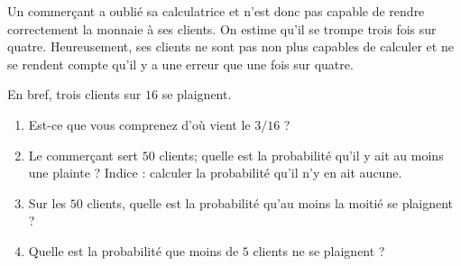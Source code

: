 
\begin{exercice}\label{exoPremiere-0088}

Un commerçant a oublié sa calculatrice et n'est donc pas capable de rendre correctement la monnaie à ses clients. On estime qu'il se trompe trois fois sur quatre. Heureusement, ses clients ne sont pas non plus capables de calculer et ne se rendent compte qu'il y a une erreur que une fois sur quatre.

En bref, trois clients sur \( 16\) se plaignent.
\begin{enumerate}
    \item
        Est-ce que vous comprenez d'où vient le \( 3/16\) ?
    \item
        Le commerçant sert \( 50\) clients; quelle est la probabilité qu'il y ait au moins une plainte ? Indice : calculer la probabilité qu'il n'y en ait aucune.
    \item
        Sur les \( 50\) clients, quelle est la probabilité qu'au moins la moitié se plaignent ?
    \item
        Quelle est la probabilité que moins de \( 5\) clients ne se plaignent ?
\end{enumerate}

\end{exercice}
